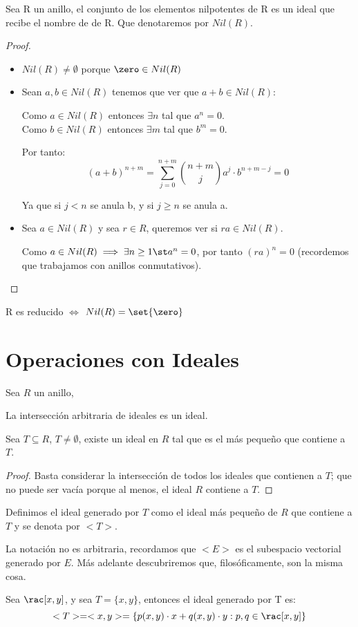 \begin{lemma}
 Sea R un anillo, el conjunto de los elementos nilpotentes de R es un ideal que recibe el nombre de  de R. Que denotaremos por $Nil(R)$.
\end{lemma}
\begin{proof}
	\begin{itemize}
		\item $Nil(R) \neq \emptyset$ porque $\zero \in Nil(R)$
		\item Sean $a,b \in Nil(R)$ tenemos que ver que $a+b \in Nil(R)$:

		Como $a \in Nil(R)$ entonces $\exists n$ tal que $a^n=0$.\\
		Como $b \in Nil(R)$ entonces $\exists m$ tal que $b^m=0$.

		Por tanto:
		$$(a+b)^{n+m} = \sum_{j=0}^{n+m} \binom{n+m}{j} a^j \cdot b^{n+m-j} = 0$$

		Ya que si $j<n$ se anula b, y si $j \geq n$ se anula a.
		\item Sea $a \in Nil(R)$ y sea $r\in R$, queremos ver si $ra \in Nil(R)$.

		Como $a\in Nil(R) \implies \exists n \geq 1 \st a^n=0$, por tanto $(ra)^n = 0$ (recordemos que trabajamos con anillos conmutativos).
	\end{itemize}
\end{proof}

\begin{prop}
	R es reducido $\Leftrightarrow$ $Nil(R)=\set{\zero}$
\end{prop}

\section{Operaciones con Ideales}
Sea $R$ un anillo,
\begin{prop}
	La intersección arbitraria de ideales es un ideal.
\end{prop}
\begin{prop}
	Sea $T \subseteq R$, $T \neq \emptyset$, existe un ideal en $R$ tal que es el más pequeño que contiene a $T$.
\end{prop}
\begin{proof}
	Basta considerar la intersección de todos los ideales que contienen a $T$; que no puede ser vacía porque al menos, el ideal $R$ contiene a $T$.
\end{proof}

\begin{defn}
Definimos el ideal generado por $T$ como el ideal más pequeño de $R$ que contiene a $T$ y se denota por $\mathopen{<}T\mathclose{>}$.
\end{defn}

La notación no es arbitraria, recordamos que $\mathopen{<} E \mathclose{>}$ es el subespacio vectorial generado por $E$. Más adelante descubriremos que, filosóficamente, son la misma cosa.

\begin{example} Sea $\rac[x,y]$, y sea $T=\{x,y\}$, entonces el ideal generado por T es:
	$$<T> = <x,y>= \{p(x,y)\cdot x+q(x,y)\cdot y : p,q \in \rac[x,y]\}$$
\end{example}



